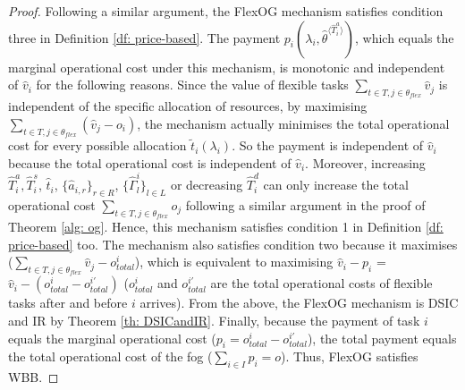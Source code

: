 \documentclass[11pt]{phdthesis}
\begin{document}
\begin{proof}
  Following a similar argument, the FlexOG mechanism satisfies condition three in Definition \ref{df: price-based}. The payment $p_i(\lambda_i, \hat{\theta}^{\langle \hat{T}_i^a \rangle}) $, which equals the marginal operational cost under this mechanism, is monotonic and independent of $ \hat{v}_i $ for the following reasons. Since the value of flexible tasks $ \underset{t\in T,  j \in \theta_{flex}}{\sum} \hat{v}_j  $ is independent of the specific allocation of resources, by maximising $ \underset{t\in T,  j \in \theta_{flex}}{\sum} (\hat{v}_j  - o_i )$, the mechanism actually minimises the total operational cost for every possible allocation $\tilde{t}_i(\lambda_i)$. So the payment is independent of $ \hat{v}_i $ because the total operational cost is independent of $ \hat{v}_i $. Moreover, increasing $\hat{T}_i^a, \hat{T}_i^s$, $ \hat{t}_i $, $ \{ \hat{a}_{i,r} \}_{r \in R} $, $ \{ \hat{\Gamma}_l^i \}_{l \in L} $ or decreasing  $ \hat{T}_i^d$ can only increase the total operational cost $\underset{t\in T,  j \in \theta_{flex}}{\sum} o_j$ following a similar argument in the proof of Theorem \ref{alg: og}. Hence, this mechanism satisfies condition 1 in Definition \ref{df: price-based} too. The mechanism also satisfies condition two because it maximises ($ \underset{t\in T,  j \in \theta_{flex}}{\sum} \hat{v}_j  - o_{total}^i$), which is equivalent to maximising $ \hat{v}_i - p_i$ = $ \hat{v}_i - (o_{total}^i - o_{total}^{i\prime}) $ ($ o_{total}^i $ and $ o_{total}^{i\prime} $ are the total operational costs of flexible tasks after and before $ i $ arrives). From the above, the FlexOG mechanism is DSIC and IR by Theorem \ref{th: DSICandIR}. Finally, because the payment of task $ i $ equals the marginal operational cost ($ p_i =o_{total}^i - o_{total}^{i\prime} $), the total payment equals the total operational cost of the fog ($ \sum_{i \in I}{p_i} = o $). Thus, FlexOG satisfies WBB.

\end{proof}
\end{document}
